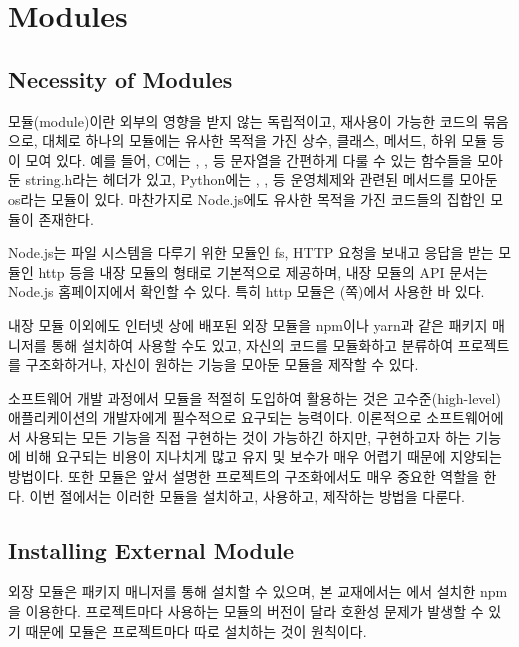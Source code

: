 \section{Modules}\label{sect:modules}

\subsection*{Necessity of Modules}

모듈(module)이란 외부의 영향을 받지 않는 독립적이고, 재사용이 가능한 코드의 묶음으로, 대체로 하나의 모듈에는 유사한 목적을 가진 상수, 클래스, 메서드, 하위 모듈 등이 모여 있다. 예를 들어, C에는 , ,  등 문자열을 간편하게 다룰 수 있는 함수들을 모아둔 string.h라는 헤더가 있고, Python에는 , ,  등 운영체제와 관련된 메서드를 모아둔 os라는 모듈이 있다. 마찬가지로 Node.js에도 유사한 목적을 가진 코드들의 집합인 모듈이 존재한다.

Node.js는 파일 시스템을 다루기 위한 모듈인 fs, HTTP 요청을 보내고 응답을 받는 모듈인 http 등을 내장 모듈의 형태로 기본적으로 제공하며, 내장 모듈의 API 문서는 Node.js 홈페이지에서 확인할 수 있다. 특히 http 모듈은 (\pageref{code:nodejs-simple-web-server}쪽)에서 사용한 바 있다.

내장 모듈 이외에도 인터넷 상에 배포된 외장 모듈을 npm이나 yarn과 같은 패키지 매니저를 통해 설치하여 사용할 수도 있고, 자신의 코드를 모듈화하고 분류하여 프로젝트를 구조화하거나, 자신이 원하는 기능을 모아둔 모듈을 제작할 수 있다.

소프트웨어 개발 과정에서 모듈을 적절히 도입하여 활용하는 것은 고수준(high-level) 애플리케이션의 개발자에게 필수적으로 요구되는 능력이다. 이론적으로 소프트웨어에서 사용되는 모든 기능을 직접 구현하는 것이 가능하긴 하지만, 구현하고자 하는 기능에 비해 요구되는 비용이 지나치게 많고 유지 및 보수가 매우 어렵기 때문에 지양되는 방법이다. 또한 모듈은 앞서 설명한 프로젝트의 구조화에서도 매우 중요한 역할을 한다. 이번 절에서는 이러한 모듈을 설치하고, 사용하고, 제작하는 방법을 다룬다.

\subsection*{Installing External Module}

외장 모듈은 패키지 매니저를 통해 설치할 수 있으며, 본 교재에서는 에서 설치한 npm을 이용한다. 프로젝트마다 사용하는 모듈의 버전이 달라 호환성 문제가 발생할 수 있기 때문에 모듈은 프로젝트마다 따로 설치하는 것이 원칙이다.

